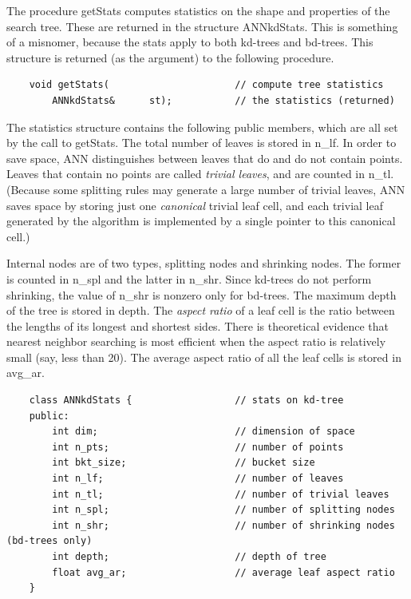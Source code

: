 \documentclass[11pt]{article}		%
\newcommand{\ANN}[0]{\textsf{ANN}}
\begin{document}
The procedure getStats computes statistics on the shape and properties
of the search tree.  These are returned in the structure \textsf{ANNkdStats}.
This is something of a misnomer, because the stats apply to both kd-trees
and bd-trees.  This structure is returned (as the argument) to the
following procedure.

{\small \begin{verbatim}
    void getStats(                      // compute tree statistics
        ANNkdStats&      st);           // the statistics (returned)
\end{verbatim} }

The statistics structure contains the following public members, which
are all set by the call to \textsf{getStats}.  The total number of
leaves is stored in \textsf{n\_lf}. In order to save space, {\ANN}
distinguishes between leaves that do and do not contain points.  Leaves
that contain no points are called \emph{trivial leaves}, and are counted
in \textsf{n\_tl}.  (Because some splitting rules may generate a large
number of trivial leaves, {\ANN} saves space by storing just one
\emph{canonical} trivial leaf cell, and each trivial leaf generated by
the algorithm is implemented by a single pointer to this canonical
cell.)

Internal nodes are of two types, splitting nodes and shrinking nodes.
The former is counted in \textsf{n\_spl} and the latter in
\textsf{n\_shr}.  Since kd-trees do not perform shrinking, the value of
\textsf{n\_shr} is nonzero only for bd-trees.  The maximum depth of the
tree is stored in \textsf{depth}.  The \emph{aspect ratio} of a leaf
cell is the ratio between the lengths of its longest and shortest sides.
There is theoretical evidence that nearest neighbor searching is most
efficient when the aspect ratio is relatively small (say, less than 20).
The average aspect ratio of all the leaf cells is stored in
\textsf{avg\_ar}.

{\small \begin{verbatim}
    class ANNkdStats {                  // stats on kd-tree
    public:
        int dim;                        // dimension of space
        int n_pts;                      // number of points
        int bkt_size;                   // bucket size
        int n_lf;                       // number of leaves
        int n_tl;                       // number of trivial leaves
        int n_spl;                      // number of splitting nodes
        int n_shr;                      // number of shrinking nodes (bd-trees only)
        int depth;                      // depth of tree
        float avg_ar;                   // average leaf aspect ratio
    }
\end{verbatim} }
\end{document}
